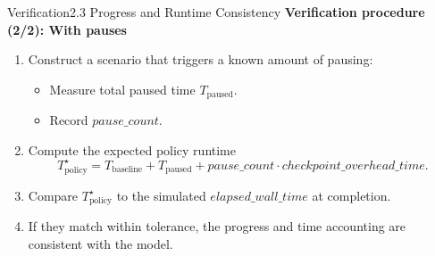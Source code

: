 \begin{frame}{Verification}{2.3 Progress and Runtime Consistency}
  \textbf{Verification procedure (2/2): With pauses}
  \begin{enumerate}
    \item Construct a scenario that triggers a known amount of pausing:
      \begin{itemize}
        \item Measure total paused time $T_{\text{paused}}$.
        \item Record $\mathit{pause\_count}$.
      \end{itemize}
    \item Compute the expected policy runtime
      \[
        T_{\text{policy}}^{\star} =
        T_{\text{baseline}} + T_{\text{paused}} +
        \mathit{pause\_count} \cdot \mathit{checkpoint\_overhead\_time}.
      \]
    \item Compare $T_{\text{policy}}^{\star}$ to the simulated
      $\mathit{elapsed\_wall\_time}$ at completion.
    \item If they match within tolerance, the progress and time accounting are
      consistent with the model.
  \end{enumerate}
\end{frame}